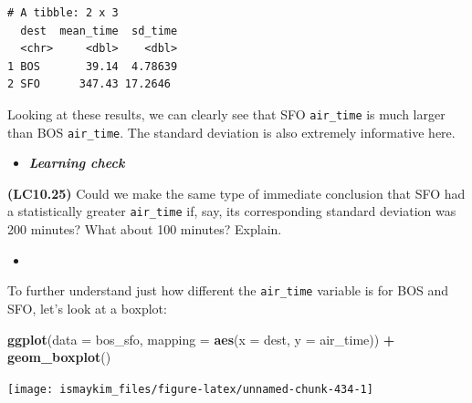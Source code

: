 \documentclass[12pt, krantz2,]{krantz}
\makeatletter
\newenvironment{Shaded}{\begin{snugshade}}{\end{snugshade}}
\newcommand{\DataTypeTok}[1]{\textcolor[rgb]{0.27,0.27,0.27}{#1}}
\newcommand{\KeywordTok}[1]{\textcolor[rgb]{0.27,0.27,0.27}{\textbf{#1}}}
\newcommand{\NormalTok}[1]{#1}
\newcommand{\OperatorTok}[1]{\textcolor[rgb]{0.43,0.43,0.43}{\textbf{#1}}}
\newcommand{\StringTok}[1]{\textcolor[rgb]{0.5,0.5,0.5}{#1}}
\newenvironment{kframe}{%
\medskip{}
\setlength{\fboxsep}{.8em}
 \def\at@end@of@kframe{}%
 \ifinner\ifhmode%
  \def\at@end@of@kframe{\end{minipage}}%
  \begin{minipage}{\columnwidth}%
 \fi\fi%
 \def\FrameCommand##1{\hskip\@totalleftmargin \hskip-\fboxsep
 \colorbox{shadecolor}{##1}\hskip-\fboxsep
     \hskip-\linewidth \hskip-\@totalleftmargin \hskip\columnwidth}%
 \MakeFramed {\advance\hsize-\width
   \@totalleftmargin\z@ \linewidth\hsize
   \@setminipage}}%
 {\par\unskip\endMakeFramed%
 \at@end@of@kframe}
\renewenvironment{Shaded}{\begin{kframe}}{\end{kframe}}
\newenvironment{rmdblock}[1]
  {\begin{shaded*}
  \begin{itemize}
  \renewcommand{\labelitemi}{
    \raisebox{-.7\height}[0pt][0pt]{
    }
  }
  \item
  }
  {
  \end{itemize}
  \end{shaded*}
  }
\newenvironment{learncheck}
  {\begin{rmdblock}{warning}}
  {\end{rmdblock}}
\makeatother
\begin{document}
\begin{Shaded}
\end{Shaded}

\begin{verbatim}
# A tibble: 2 x 3
  dest  mean_time  sd_time
  <chr>     <dbl>    <dbl>
1 BOS       39.14  4.78639
2 SFO      347.43 17.2646 
\end{verbatim}

Looking at these results, we can clearly see that SFO \texttt{air\_time} is much larger than BOS \texttt{air\_time}. The standard deviation is also extremely informative here.

\begin{learncheck}
\textbf{\emph{Learning check}}
\end{learncheck}

\textbf{(LC10.25)} Could we make the same type of immediate conclusion that SFO had a statistically greater \texttt{air\_time} if, say, its corresponding standard deviation was 200 minutes? What about 100 minutes? Explain.

\begin{learncheck}

\end{learncheck}

To further understand just how different the \texttt{air\_time} variable is for BOS and SFO, let's look at a boxplot:

\begin{Shaded}
\begin{Highlighting}[]
\KeywordTok{ggplot}\NormalTok{(}\DataTypeTok{data =}\NormalTok{ bos_sfo, }\DataTypeTok{mapping =} \KeywordTok{aes}\NormalTok{(}\DataTypeTok{x =}\NormalTok{ dest, }\DataTypeTok{y =}\NormalTok{ air_time)) }\OperatorTok{+}
\StringTok{  }\KeywordTok{geom_boxplot}\NormalTok{()}
\end{Highlighting}
\end{Shaded}

\begin{center}\texttt{[image: ismaykim\_files/figure-latex/unnamed-chunk-434-1]} \end{center}
\end{document}

